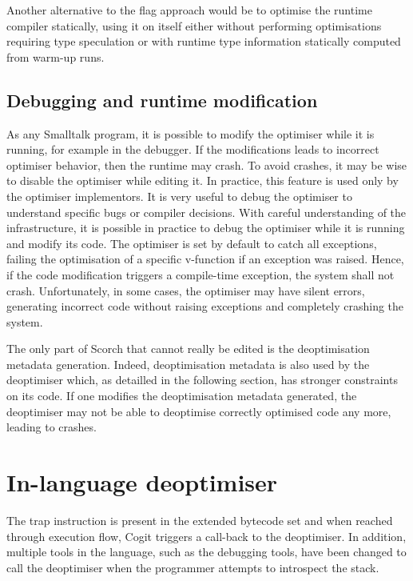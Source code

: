 \documentclass[a4paper,12pt,twoside]{../includes/ThesisStyle}
\begin{document}
Another alternative to the flag approach would be to optimise the runtime compiler statically, using it on itself either without performing optimisations requiring type speculation or with runtime type information statically computed from warm-up runs. 

\subsection{Debugging and runtime modification}


As any Smalltalk program, it is possible to modify the optimiser while it is running, for example in the debugger. If the modifications leads to incorrect optimiser behavior, then the runtime may crash. To avoid crashes, it may be wise to disable the optimiser while editing it. In practice, this feature is used only by the optimiser implementors. It is very useful to debug the optimiser to understand specific bugs or compiler decisions. With careful understanding of the infrastructure, it is possible in practice to debug the optimiser while it is running and modify its code. The optimiser is set by default to catch all exceptions, failing the optimisation of a specific v-function if an exception was raised. Hence, if the code modification triggers a compile-time exception, the system shall not crash. Unfortunately, in some cases, the optimiser may have silent errors, generating incorrect code without raising exceptions and completely crashing the system.

The only part of Scorch that cannot really be edited is the deoptimisation metadata generation. Indeed, deoptimisation metadata is also used by the deoptimiser which, as detailled in the following section, has stronger constraints on its code. If one modifies the deoptimisation metadata generated, the deoptimiser may not be able to deoptimise correctly optimised code any more, leading to crashes.

\section{In-language deoptimiser}

The trap instruction is present in the extended bytecode set and when reached through execution flow, Cogit triggers a call-back to the deoptimiser. In addition, multiple tools in the language, such as the debugging tools, have been changed to call the deoptimiser when the programmer attempts to introspect the stack.
\end{document}

